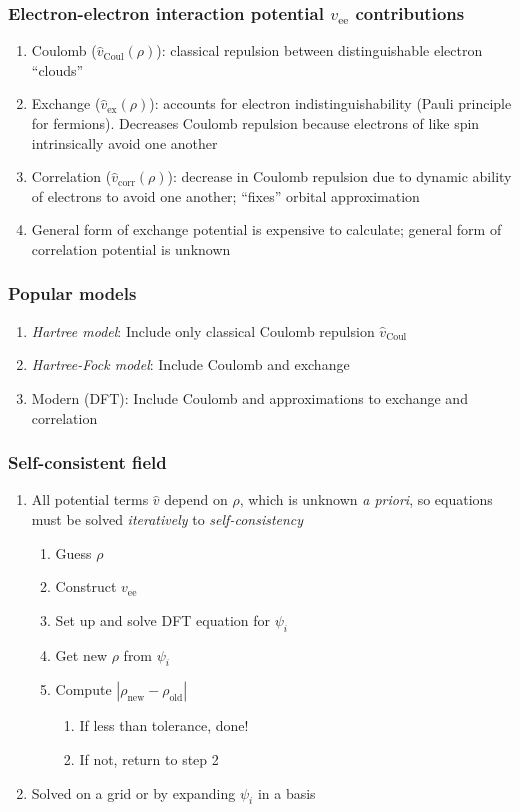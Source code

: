 \documentclass[11pt]{article}
\begin{document}
\subsubsection{Electron-electron interaction potential \(v_\text{ee}\) contributions}
\label{sec:org4916548}
\begin{enumerate}
\item Coulomb (\(\hat v_\mathrm{Coul}(\rho)\)): classical repulsion between distinguishable electron ``clouds''
\item Exchange (\(\hat v_\mathrm{ex}(\rho)\)): accounts for electron indistinguishability (Pauli principle for fermions).  Decreases Coulomb repulsion because electrons of like spin intrinsically avoid one another
\item Correlation (\(\hat v_\mathrm{corr}(\rho)\)): decrease in Coulomb repulsion due to dynamic ability of electrons to avoid one another; ``fixes'' orbital approximation
\item General form of exchange potential is expensive to calculate; general form of correlation potential is unknown
\end{enumerate}
\subsubsection{Popular models}
\label{sec:orgcd01b3f}
\begin{enumerate}
\item \emph{Hartree model}: Include only classical Coulomb repulsion \(\hat v_\mathrm{Coul}\)
\item \emph{Hartree-Fock model}: Include Coulomb and exchange
\item Modern (DFT): Include Coulomb and approximations to exchange and correlation
\end{enumerate}
\subsubsection{Self-consistent field}
\label{sec:orge39bebd}
\begin{enumerate}
\item All potential terms \(\hat v\) depend on \(\rho\), which is unknown \emph{a priori}, so  equations must be solved \emph{iteratively} to \emph{self-consistency}
\begin{enumerate}
\item Guess \(\rho\)
\item Construct \(v_\text{ee}\)
\item Set up and solve DFT equation for \(\psi_i\)
\item Get new \(\rho\) from \(\psi_i\)
\item Compute \(|\rho_\text{new} - \rho_\text{old}|\)
\begin{enumerate}
\item If less than tolerance, done!
\item If not, return to step 2
\end{enumerate}
\end{enumerate}
\item Solved on a grid or by expanding \(\psi_i\) in a basis
\end{enumerate}
\end{document}
